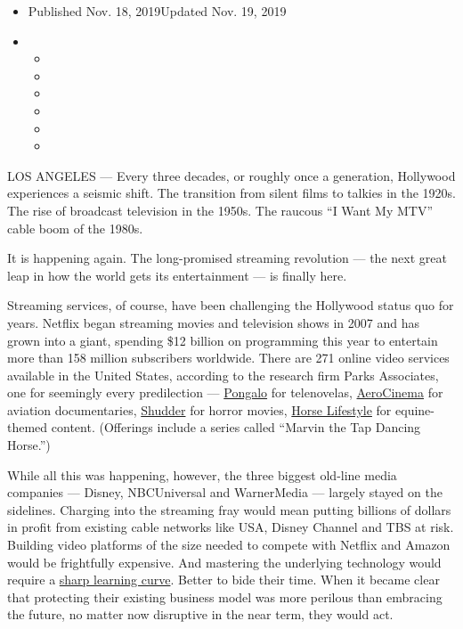 \begin{itemize}
\item
  Published Nov. 18, 2019Updated Nov. 19, 2019
\item
  \begin{itemize}
  \item
  \item
  \item
  \item
  \item
  \item
  \end{itemize}
\end{itemize}

LOS ANGELES --- Every three decades, or roughly once a generation,
Hollywood experiences a seismic shift. The transition from silent films
to talkies in the 1920s. The rise of broadcast television in the 1950s.
The raucous ``I Want My MTV'' cable boom of the 1980s.

It is happening again. The long-promised streaming revolution --- the
next great leap in how the world gets its entertainment --- is finally
here.

Streaming services, of course, have been challenging the Hollywood
status quo for years. Netflix began streaming movies and television
shows in 2007 and has grown into a giant, spending \$12 billion on
programming this year to entertain more than 158 million subscribers
worldwide. There are 271 online video services available in the United
States, according to the research firm Parks Associates, one for
seemingly every predilection --- \href{https://pongalo.com/}{Pongalo}
for telenovelas, \href{https://aerocinema.com/}{AeroCinema} for aviation
documentaries, \href{https://www.shudder.com/}{Shudder} for horror
movies, \href{https://horselifestyle.tv/en}{Horse Lifestyle} for
equine-themed content. (Offerings include a series called ``Marvin the
Tap Dancing Horse.'')

While all this was happening, however, the three biggest old-line media
companies --- Disney, NBCUniversal and WarnerMedia --- largely stayed on
the sidelines. Charging into the streaming fray would mean putting
billions of dollars in profit from existing cable networks like USA,
Disney Channel and TBS at risk. Building video platforms of the size
needed to compete with Netflix and Amazon would be frightfully
expensive. And mastering the underlying technology would require a
\href{https://www.nytimes3xbfgragh.onion/2012/10/22/business/media/disney-struggling-to-find-its-digital-footing-overhauls-disneycom.html}{sharp
learning curve}. Better to bide their time. When it became clear that
protecting their existing business model was more perilous than
embracing the future, no matter now disruptive in the near term, they
would act.

